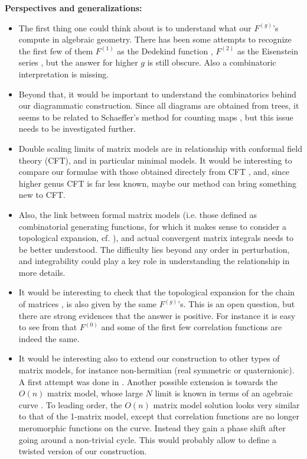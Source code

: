 \bigskip

{\bf Perspectives and generalizations:}


\begin{itemize}

\item The first thing one could think about is to understand what our $F^{(g)}$'s compute in algebraic geometry. There has been some attempts to recognize the first few of them $F^{(1)}$ as the Dedekind function \cite{Dubrovin1, Dubrovin2}, $F^{(2)}$ as the Eisenstein series \cite{klemm}, but the answer for higher $g$ is still obscure.
Also a combinatoric interpretation is missing.


\item Beyond that, it would be important to understand the combinatorics behind our diagrammatic construction. Since all diagrams are obtained from trees, it seems to be related to Schaeffer's method for counting maps \cite{schaeffer}, but this issue needs to be investigated further.

\item Double scaling limits of matrix models are in relationship with conformal field theory (CFT), and in particular minimal models. It would be interesting to compare our formulae with those obtained directely from CFT \cite{BookPDF, Zamozamo, Zamo}, and, since higher genus CFT is far less known, maybe our method can bring something new to CFT.

\item Also, the link between formal matrix models (i.e. those defined as combinatorial generating functions, for which it makes sense to consider a topological expansion, cf. \cite{eynform}), and actual convergent matrix integrals needs to be better understood. The difficulty lies beyond any order in perturbation, and integrability could play a key role in understanding the relationship in more details.

\item It would be interesting to check that the topological expansion for the chain of matrices \cite{eynmultimat},  is also given by the same $F^{(g)}$'s. This is an open question, but there are strong evidences that the answer is positive. For instance it is easy to see from \cite{eynmultimat} that $F^{(0)}$ and some of the first few correlation functions are indeed the same.

\item It would be interesting also to extend our construction to other types of matrix models, for instance non-hermitian (real symmetric or quaternionic). A first attempt was done in \cite{ChEynbeta}.
Another possible extension is towards the $O(n)$ matrix model, whose large $N$ limit is known in terms of an agebraic curve \cite{ECK1,ECK2}. To leading order, the $O(n)$ matrix model solution looks very similar to that of the 1-matrix model, except that correlation functions are no longer meromorphic functions on the curve. Instead they gain a phase shift after going around a non-trivial cycle. This would probably allow to define a twisted version of our construction.

\end{itemize}



